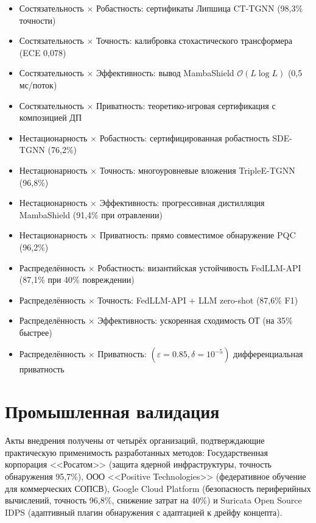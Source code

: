 \begin{itemize}
\item Состязательность $\times$ Робастность: сертификаты Липшица CT-TGNN (98,3\% точности)
\item Состязательность $\times$ Точность: калибровка стохастического трансформера (ECE 0,078)
\item Состязательность $\times$ Эффективность: вывод MambaShield $\mathcal{O}(L\log L)$ (0,5\,мс/поток)
\item Состязательность $\times$ Приватность: теоретико-игровая сертификация с композицией ДП
\item Нестационарность $\times$ Робастность: сертифицированная робастность SDE-TGNN (76,2\%)
\item Нестационарность $\times$ Точность: многоуровневые вложения TripleE-TGNN (96,8\%)
\item Нестационарность $\times$ Эффективность: прогрессивная дистилляция MambaShield (91,4\% при отравлении)
\item Нестационарность $\times$ Приватность: прямо совместимое обнаружение PQC (96,2\%)
\item Распределённость $\times$ Робастность: византийская устойчивость FedLLM-API (87,1\% при 40\% повреждении)
\item Распределённость $\times$ Точность: FedLLM-API + LLM zero-shot (87,6\% F1)
\item Распределённость $\times$ Эффективность: ускоренная сходимость ОТ (на 35\% быстрее)
\item Распределённость $\times$ Приватность: $(\varepsilon{=}0.85,\delta{=}10^{-5})$ дифференциальная приватность
\end{itemize}


\section*{Промышленная валидация}

Акты внедрения получены от четырёх организаций, подтверждающие практическую применимость разработанных методов: Государственная корпорация <<Росатом>> (защита ядерной инфраструктуры, точность обнаружения 95,7\%), ООО <<Positive Technologies>> (федеративное обучение для коммерческих СОПСВ), Google Cloud Platform (безопасность периферийных вычислений, точность 96,8\%, снижение затрат на 40\%) и Suricata Open Source IDPS (адаптивный плагин обнаружения с адаптацией к дрейфу концепта).


